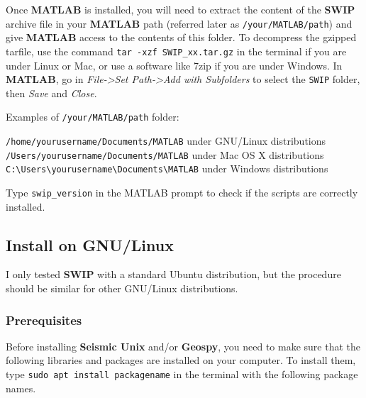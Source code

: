 \documentclass[twoside,a4paper]{article}
\def\SWIP{\textbf{SWIP}}
\def\SeismicUnix{\textbf{Seismic Unix}}
\def\Geopsy{\textbf{Geospy}}
\def\MATLAB{\textbf{MATLAB}}
\begin{document}


Once {\MATLAB} is installed, you will need to extract the content of the {\SWIP} archive file in your {\MATLAB} path (referred later as \verb|/your/MATLAB/path|) and give {\MATLAB} access to the contents of this folder. To decompress the gzipped tarfile, use the command \verb|tar -xzf SWIP_xx.tar.gz| in the terminal if you are under Linux or Mac, or use a software like 7zip if you are under Windows. In {\MATLAB}, go in \textit{File->Set Path->Add with Subfolders} to select the \verb|SWIP| folder, then \textit{Save} and \textit{Close}.

Examples of \verb|/your/MATLAB/path| folder:

\verb|/home/yourusername/Documents/MATLAB| under GNU/Linux distributions\\
\verb|/Users/yourusername/Documents/MATLAB| under Mac OS X distributions\\
\verb|C:\Users\yourusername\Documents\MATLAB| under Windows distributions

Type \verb|swip_version| in the MATLAB prompt to check if the scripts are correctly installed.

\clearpage
\subsection{Install on GNU/Linux}
I only tested {\SWIP} with a standard Ubuntu distribution, but the procedure should be similar for other GNU/Linux distributions.
\subsubsection{Prerequisites}
Before installing {\SeismicUnix} and/or {\Geopsy}, you need to make sure that the following libraries and packages are installed on your computer. To install them, type \verb|sudo apt install packagename| in the terminal with the following package names.
\end{document}
